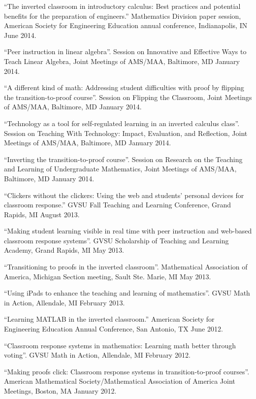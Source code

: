 \documentclass[letterpaper]{article}
\renewenvironment{itemize}{
  \begin{list}{}{
    \setlength{\leftmargin}{1.5em}
	\setlength{\itemsep}{0in}
  }
}{
  \end{list}
}
\begin{document}
\begin{itemize}
	\item ``The inverted classroom in introductory calculus: Best practices and potential benefits for the preparation of engineers.'' Mathematics Division paper session, American Society for Engineering Education annual conference, Indianapolis, IN June 2014. 
	\item ``Peer instruction in linear algebra''. Session on Innovative and Effective Ways to Teach Linear Algebra, Joint Meetings of AMS/MAA, Baltimore, MD January 2014. 
	\item ``A different kind of math: Addressing student difficulties with proof by flipping the transition-to-proof course''. Session on Flipping the Classroom, Joint Meetings of AMS/MAA, Baltimore, MD January 2014.
	\item ``Technology as a tool for self-regulated learning in an inverted calculus class''. Session on Teaching With Technology: Impact, Evaluation, and Reflection, Joint Meetings of AMS/MAA, Baltimore, MD January 2014.
	\item ``Inverting the transition-to-proof course''. Session on Research on the Teaching and Learning of Undergraduate Mathematics, Joint Meetings of AMS/MAA, Baltimore, MD January 2014.
	\item ``Clickers without the clickers: Using the web and students' personal devices for classroom response.'' GVSU Fall Teaching and Learning Conference, Grand Rapids, MI August 2013. 
	\item ``Making student learning visible in real time with peer instruction and web-based classroom response systems''. GVSU Scholarship of Teaching and Learning Academy, Grand Rapids, MI May 2013. 
	\item ``Transitioning to proofs in the inverted classroom''. Mathematical Association of America, Michigan Section meeting, Sault Ste. Marie, MI May 2013. 
	\item ``Using iPads to enhance the teaching and learning of mathematics''. GVSU Math in Action, Allendale, MI February 2013. 
	\item ``Learning MATLAB in the inverted classroom.'' American Society for Engineering Education Annual Conference, San Antonio, TX June 2012. 
	\item ``Classroom response systems in mathematics: Learning math better through voting''. GVSU Math in Action, Allendale, MI February 2012. 
	\item ``Making proofs click: Classroom response systems in transition-to-proof courses''. American Mathematical Society/Mathematical Association of America Joint Meetings, Boston, MA January 2012. 

\end{itemize}
\end{document}
